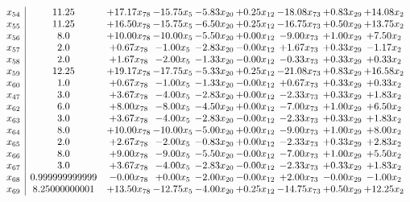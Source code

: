 \documentclass[8pt]{article}
\begin{document}
\[\begin{array}{c| c c@{\hskip 2pt} c@{\hskip 2pt} c@{\hskip 2pt} c@{\hskip 2pt} c@{\hskip 2pt} c@{\hskip 2pt} c@{\hskip 2pt} }
 x_{54}   &  11.25 & + 17.17 x_{78} & -15.75 x_{5} & -5.83 x_{20} & +  0.25 x_{12} & -18.08 x_{73} & +  0.83 x_{29} & + 14.08 x_{2}\\
 x_{55}   &  11.25 & + 16.50 x_{78} & -15.75 x_{5} & -6.50 x_{20} & +  0.25 x_{12} & -16.75 x_{73} & +  0.50 x_{29} & + 13.75 x_{2}\\
 x_{56}   &  8.0 & + 10.00 x_{78} & -10.00 x_{5} & -5.50 x_{20} & +  0.00 x_{12} & -9.00 x_{73} & +  1.00 x_{29} & +  7.50 x_{2}\\
 x_{57}   &  2.0 & +  0.67 x_{78} & -1.00 x_{5} & -2.83 x_{20} & -0.00 x_{12} & +  1.67 x_{73} & +  0.33 x_{29} & -1.17 x_{2}\\
 x_{58}   &  2.0 & +  1.67 x_{78} & -2.00 x_{5} & -1.33 x_{20} & -0.00 x_{12} & -0.33 x_{73} & +  0.33 x_{29} & +  0.33 x_{2}\\
 x_{59}   &  12.25 & + 19.17 x_{78} & -17.75 x_{5} & -5.33 x_{20} & +  0.25 x_{12} & -21.08 x_{73} & +  0.83 x_{29} & + 16.58 x_{2}\\
 x_{60}   &  1.0 & +  0.67 x_{78} & -1.00 x_{5} & -1.33 x_{20} & -0.00 x_{12} & +  0.67 x_{73} & +  0.33 x_{29} & +  0.33 x_{2}\\
 x_{47}   &  3.0 & +  3.67 x_{78} & -4.00 x_{5} & -2.83 x_{20} & +  0.00 x_{12} & -2.33 x_{73} & +  0.33 x_{29} & +  1.83 x_{2}\\
 x_{62}   &  6.0 & +  8.00 x_{78} & -8.00 x_{5} & -4.50 x_{20} & +  0.00 x_{12} & -7.00 x_{73} & +  1.00 x_{29} & +  6.50 x_{2}\\
 x_{63}   &  3.0 & +  3.67 x_{78} & -4.00 x_{5} & -2.83 x_{20} & -0.00 x_{12} & -2.33 x_{73} & +  0.33 x_{29} & +  1.83 x_{2}\\
 x_{64}   &  8.0 & + 10.00 x_{78} & -10.00 x_{5} & -5.00 x_{20} & +  0.00 x_{12} & -9.00 x_{73} & +  1.00 x_{29} & +  8.00 x_{2}\\
 x_{65}   &  2.0 & +  2.67 x_{78} & -2.00 x_{5} & -0.83 x_{20} & +  0.00 x_{12} & -2.33 x_{73} & +  0.33 x_{29} & +  2.83 x_{2}\\
 x_{66}   &  8.0 & +  9.00 x_{78} & -9.00 x_{5} & -5.50 x_{20} & -0.00 x_{12} & -7.00 x_{73} & +  1.00 x_{29} & +  5.50 x_{2}\\
 x_{67}   &  3.0 & +  3.67 x_{78} & -4.00 x_{5} & -2.83 x_{20} & -0.00 x_{12} & -2.33 x_{73} & +  0.33 x_{29} & +  1.83 x_{2}\\
 x_{68}   &  0.999999999999 & -0.00 x_{78} & +  0.00 x_{5} & -2.00 x_{20} & -0.00 x_{12} & +  2.00 x_{73} & -0.00 x_{29} & -1.00 x_{2}\\
 x_{69}   &  8.25000000001 & + 13.50 x_{78} & -12.75 x_{5} & -4.00 x_{20} & +  0.25 x_{12} & -14.75 x_{73} & +  0.50 x_{29} & + 12.25 x_{2}\\

\end{array}\]
\end{document}
